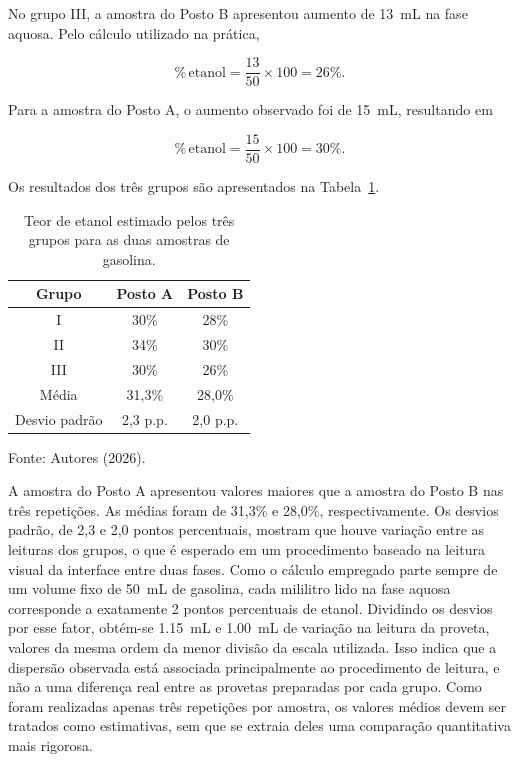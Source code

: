 \documentclass[11pt]{ifscarticle}
\begin{document}
No grupo III, a amostra do Posto B apresentou aumento de \SI{13}{\milli\liter} na fase aquosa. Pelo cálculo utilizado na prática,

\begin{equation}
\%\,\text{etanol} =
\frac{13}{50}\times 100 = 26\%.
\end{equation}

Para a amostra do Posto A, o aumento observado foi de \SI{15}{\milli\liter}, resultando em

\begin{equation}
\%\,\text{etanol} =
\frac{15}{50}\times 100 = 30\%.
\end{equation}

Os resultados dos três grupos são apresentados na Tabela~\ref{tab:resultados}.

\begin{table}[htb]
    \centering
    \caption{Teor de etanol estimado pelos três grupos para as duas amostras de gasolina.}
    \label{tab:resultados}
    \begin{tabular}{ccc}
        \toprule
        Grupo & Posto A & Posto B \\
        \midrule
        I   & 30\% & 28\% \\
        II  & 34\% & 30\% \\
        III & 30\% & 26\% \\
        \midrule
        Média          & 31,3\% & 28,0\% \\
        Desvio padrão  & 2,3 p.p. & 2,0 p.p. \\
        \bottomrule
    \end{tabular}
    \par\smallskip
    {\footnotesize Fonte: Autores (2026).}
\end{table}

A amostra do Posto A apresentou valores maiores que a amostra do Posto B nas três repetições. As médias foram de 31,3\% e 28,0\%, respectivamente. Os desvios padrão, de 2,3 e 2,0 pontos percentuais, mostram que houve variação entre as leituras dos grupos, o que é esperado em um procedimento baseado na leitura visual da interface entre duas fases. Como o cálculo empregado parte sempre de um volume fixo de \SI{50}{\milli\liter} de gasolina, cada mililitro lido na fase aquosa corresponde a exatamente 2 pontos percentuais de etanol. Dividindo os desvios por esse fator, obtém-se \SI{1,15}{\milli\liter} e \SI{1,00}{\milli\liter} de variação na leitura da proveta, valores da mesma ordem da menor divisão da escala utilizada. Isso indica que a dispersão observada está associada principalmente ao procedimento de leitura, e não a uma diferença real entre as provetas preparadas por cada grupo. Como foram realizadas apenas três repetições por amostra, os valores médios devem ser tratados como estimativas, sem que se extraia deles uma comparação quantitativa mais rigorosa.
\end{document}
